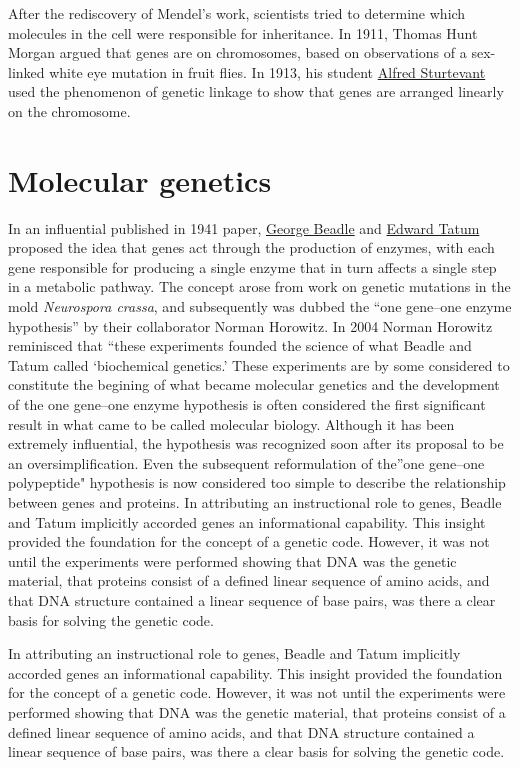 After the rediscovery of Mendel's work, scientists tried to determine which molecules in the cell were responsible for inheritance. In 1911, Thomas Hunt Morgan argued that genes are on chromosomes, based on observations of a sex-linked white eye mutation in fruit flies. In 1913, his student \href{https://en.wikipedia.org/wiki/Alfred_Sturtevant}{Alfred Sturtevant} used the phenomenon of genetic linkage to show that genes are arranged linearly on the chromosome.

\hypertarget{molecular-genetics}{%
\section{Molecular genetics}\label{molecular-genetics}}

In an influential published in 1941 paper, \href{https://en.wikipedia.org/wiki/George_Beadle}{George Beadle} and \href{https://en.wikipedia.org/wiki/Edward_Tatum}{Edward Tatum} proposed the idea that genes act through the production of enzymes, with each gene responsible for producing a single enzyme that in turn affects a single step in a metabolic pathway. The concept arose from work on genetic mutations in the mold \emph{Neurospora crassa}, and subsequently was dubbed the ``one gene--one enzyme hypothesis'' by their collaborator Norman Horowitz. In 2004 Norman Horowitz reminisced that ``these experiments founded the science of what Beadle and Tatum called `biochemical genetics.' These experiments are by some considered to constitute the begining of what became molecular genetics and the development of the one gene--one enzyme hypothesis is often considered the first significant result in what came to be called molecular biology. Although it has been extremely influential, the hypothesis was recognized soon after its proposal to be an oversimplification. Even the subsequent reformulation of the''one gene--one polypeptide" hypothesis is now considered too simple to describe the relationship between genes and proteins. In attributing an instructional role to genes, Beadle and Tatum implicitly accorded genes an informational capability. This insight provided the foundation for the concept of a genetic code. However, it was not until the experiments were performed showing that DNA was the genetic material, that proteins consist of a defined linear sequence of amino acids, and that DNA structure contained a linear sequence of base pairs, was there a clear basis for solving the genetic code.

In attributing an instructional role to genes, Beadle and Tatum implicitly accorded genes an informational capability. This insight provided the foundation for the concept of a genetic code. However, it was not until the experiments were performed showing that DNA was the genetic material, that proteins consist of a defined linear sequence of amino acids, and that DNA structure contained a linear sequence of base pairs, was there a clear basis for solving the genetic code.

